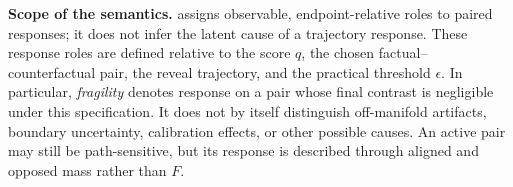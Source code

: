 
\textbf{Scope of the semantics.}
\decaf assigns observable, endpoint-relative roles to paired responses; it does not infer the latent cause of a trajectory response. These response roles are defined relative to the score $q$, the chosen factual--counterfactual pair, the reveal trajectory, and the practical threshold  $\epsilon$. In particular,
\emph{fragility} denotes response on a pair whose final contrast is negligible
under this specification. It does not by itself distinguish off-manifold
artifacts, boundary uncertainty, calibration effects, or other possible causes.
An active pair may still be path-sensitive, but its response is described
through aligned and opposed mass rather than $F$.

